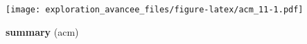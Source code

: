 \documentclass[]{book}
\newenvironment{Shaded}{\begin{snugshade}}{\end{snugshade}}
\newcommand{\KeywordTok}[1]{\textcolor[rgb]{0.13,0.29,0.53}{\textbf{#1}}}
\newcommand{\NormalTok}[1]{#1}
\newcommand{\OperatorTok}[1]{\textcolor[rgb]{0.81,0.36,0.00}{\textbf{#1}}}
\newcommand{\StringTok}[1]{\textcolor[rgb]{0.31,0.60,0.02}{#1}}
\begin{document}
\begin{Shaded}
\end{Shaded}

\texttt{[image: exploration\_avancee\_files/figure-latex/acm\_11-1.pdf]}

\begin{Shaded}
\begin{Highlighting}[]
\KeywordTok{summary}\NormalTok{ (acm)}
\end{Highlighting}
\end{Shaded}
\end{document}
